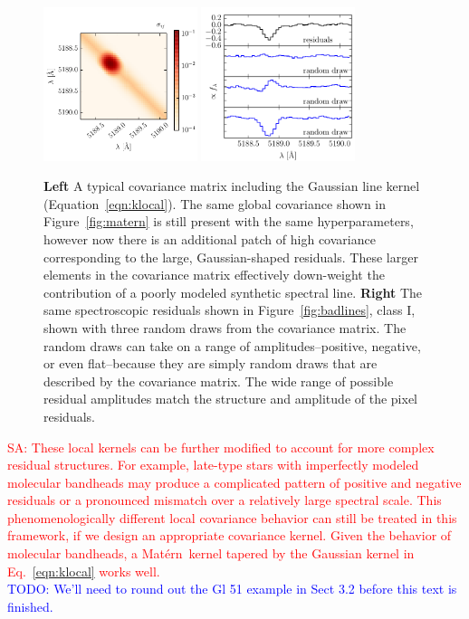 \documentclass[iop,floatfix]{emulateapj}
\newcommand{\matern}{Mat\'{e}rn}
\newcommand{\todo}[1]{ \textcolor{blue}{\\TODO: #1}}
\newcommand{\comm}[1]{ \textcolor{red}{SA: #1}}
\begin{document}
\begin{figure}[!htb]
\begin{center}
\includegraphics[width=0.4\textwidth]{figs/gauss_matrix.pdf}
\includegraphics[width=0.4\textwidth]{figs/gauss_draw.pdf}
\caption{\textbf{Left} A typical covariance matrix including the Gaussian line kernel (Equation~\ref{eqn:klocal}). The same global covariance shown in Figure~\ref{fig:matern} is still present with the same hyperparameters, however now there is an additional patch of high covariance corresponding to the large, Gaussian-shaped residuals. These larger elements in the covariance matrix effectively down-weight the contribution of a poorly modeled synthetic spectral line.
\textbf{Right} The same spectroscopic residuals shown in Figure~\ref{fig:badlines}, class I, shown with three random draws from the covariance matrix. The random draws can take on a range of amplitudes--positive, negative, or even flat--because they are simply random draws that are described by the covariance matrix. The wide range of possible residual amplitudes match the structure and amplitude of the pixel residuals.}
\label{fig:region}
\end{center}
\end{figure}

\comm{These local kernels can be further modified to account for more complex residual structures.  For 
example, late-type stars with imperfectly modeled molecular bandheads may produce a complicated 
pattern of positive and negative residuals or a pronounced mismatch over a relatively large 
spectral scale.  This phenomenologically different local covariance behavior can still be treated 
in this framework, if we design an appropriate covariance kernel. Given the behavior of molecular bandheads, a \matern\ kernel tapered by the Gaussian kernel in Eq.~\ref{eqn:klocal} works well.}
\todo{We'll need to round out the Gl 51 example in Sect 3.2 before this text is finished.}
\end{document}
